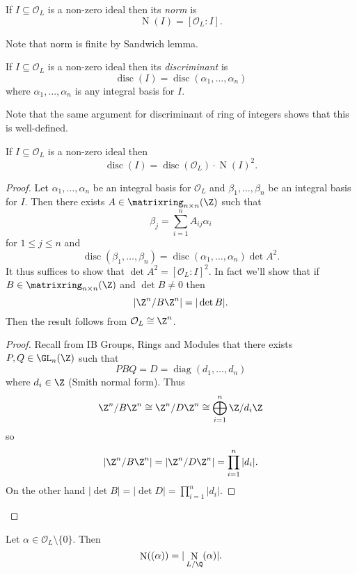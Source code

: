 \documentclass[a4paper]{article}
\renewcommand*{\O}{\mathcal{O}}
\DeclareMathOperator{\n}{N}
\DeclareMathOperator{\disc}{disc}
\begin{document}
\begin{definition}[Norm]
  If \(I \subseteq \O_L\) is a non-zero ideal then its \emph{norm} is
  \[
    \n(I) = [\O_L:I].
  \]
\end{definition}

Note that norm is finite by Sandwich lemma.

\begin{definition}[Discriminant]
  If \(I \subseteq \O_L\) is a non-zero ideal then its \emph{discriminant} is
  \[
    \disc(I) = \disc(\alpha_1, \dots, \alpha_n)
  \]
  where \(\alpha_1, \dots, \alpha_n\) is any integral basis for \(I\).
\end{definition}

Note that the same argument for discriminant of ring of integers shows that this is well-defined.

\begin{lemma}
  If \(I \subseteq \O_L\) is a non-zero ideal then
  \[
    \disc(I) = \disc(\O_L) \cdot \n(I)^2.
  \]
\end{lemma}

\begin{proof}
  Let \(\alpha_1, \dots, \alpha_n\) be an integral basis for \(\O_L\) and \(\beta_1, \dots, \beta_n\) be an integral basis for \(I\). Then there exists \(A \in \matrixring_{n \times n}(\Z)\) such that
  \[
    \beta_j = \sum_{i = 1}^n A_{ij}\alpha_i
  \]
  for \(1 \leq j \leq n\) and
  \[
    \disc(\beta_1, \dots, \beta_n) = \disc(\alpha_1, \dots, \alpha_n) \det A^2.
  \]
  It thus suffices to show that \(\det A^2 = [\O_L:I]^2\). In fact we'll show that if \(B \in \matrixring_{n \times n}(\Z)\) and \(\det B \neq 0\) then
  \[
    |\Z^n/B\Z^n| = |\det B|.
  \]
  Then the result follows from \(\O_L \cong \Z^n\).

  \begin{proof}
    Recall from IB Groups, Rings and Modules that there exists \(P, Q \in \GL_n(\Z)\) such that
    \[
      PBQ = D = \operatorname{diag}(d_1, \dots, d_n)
    \]
    where \(d_i \in \Z\) (Smith normal form). Thus
    \[
      \Z^n/B\Z^n \cong \Z^n/D\Z^n \cong \bigoplus_{i = 1}^n \Z/d_i\Z
    \]
    so
    \[
      |\Z^n/B\Z^n| = |\Z^n/D\Z^n| = \prod_{i = 1}^n |d_i|.
    \]
    On the other hand \(|\det B| = |\det D| = \prod_{i = 1}^n |d_i|\).
  \end{proof}
\end{proof}

\begin{lemma}
  Let \(\alpha \in \O_L \setminus \{0\}\). Then
  \[
    \n((\alpha)) = |\n_{L/\Q}(\alpha)|.
  \]
\end{lemma}
\end{document}
